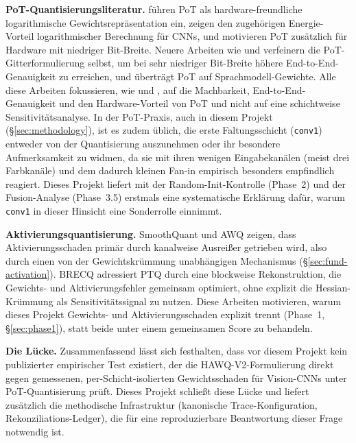 \textbf{PoT-Quantisierungsliteratur.} \citet{miyashita_pot_2016} führen PoT als hardware-freundliche logarithmische Gewichtsrepräsentation ein, \citet{lee_lognet_2017} zeigen den zugehörigen Energie-Vorteil logarithmischer Berechnung für CNNs, und \citet{przewlocka_rus_pot_2022} motivieren PoT zusätzlich für Hardware mit niedriger Bit-Breite. Neuere Arbeiten wie \citet{kim_nonzerogrid_2023} und \citet{li_denseshift_2023} verfeinern die PoT-Gitterformulierung selbst, um bei sehr niedriger Bit-Breite höhere End-to-End-Genauigkeit zu erreichen, und \citet{elgenedy_pot_llm_2025} überträgt PoT auf Sprachmodell-Gewichte. Alle diese Arbeiten fokussieren, wie \citet{miyashita_pot_2016} und \citet{przewlocka_rus_pot_2022}, auf die Machbarkeit, End-to-End-Genauigkeit und den Hardware-Vorteil von PoT und nicht auf eine schichtweise Sensitivitätsanalyse. In der PoT-Praxis, auch in diesem Projekt (\S\ref{sec:methodology}), ist es zudem üblich, die erste Faltungsschicht (\texttt{conv1}) entweder von der Quantisierung auszunehmen oder ihr besondere Aufmerksamkeit zu widmen, da sie mit ihren wenigen Eingabekanälen (meist drei Farbkanäle) und dem dadurch kleinen Fan-in empirisch besonders empfindlich reagiert. Dieses Projekt liefert mit der Random-Init-Kontrolle (Phase~2) und der Fusion-Analyse (Phase~3.5) erstmals eine systematische Erklärung dafür, warum \texttt{conv1} in dieser Hinsicht eine Sonderrolle einnimmt.
\par\medskip

\textbf{Aktivierungsquantisierung.} SmoothQuant \citep{xiao_smoothquant_2023} und AWQ \citep{lin_awq_2024} zeigen, dass Aktivierungsschaden primär durch kanalweise Ausreißer getrieben wird, also durch einen von der Gewichtskrümmung unabhängigen Mechanismus (\S\ref{sec:fund-activation}). BRECQ \citep{li_brecq_2021} adressiert PTQ durch eine blockweise Rekonstruktion, die Gewichts- und Aktivierungsfehler gemeinsam optimiert, ohne explizit die Hessian-Krümmung als Sensitivitätssignal zu nutzen. Diese Arbeiten motivieren, warum dieses Projekt Gewichts- und Aktivierungsschaden explizit trennt (Phase~1, \S\ref{sec:phase1}), statt beide unter einem gemeinsamen Score zu behandeln.
\par\medskip

\textbf{Die Lücke.} Zusammenfassend lässt sich festhalten, dass vor diesem Projekt kein publizierter empirischer Test existiert, der die HAWQ-V2-Formulierung direkt gegen gemessenen, per-Schicht-isolierten Gewichtsschaden für Vision-CNNs unter PoT-Quantisierung prüft. Dieses Projekt schließt diese Lücke und liefert zusätzlich die methodische Infrastruktur (kanonische Trace-Konfiguration, Rekonziliations-Ledger), die für eine reproduzierbare Beantwortung dieser Frage notwendig ist.